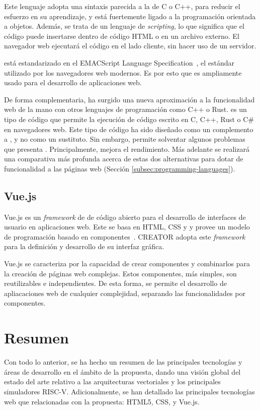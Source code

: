 Este lenguaje adopta una sintaxis parecida a la de C o C++, para reducir el esfuerzo en su aprendizaje, y está fuertemente ligado a la programación orientada a objetos. Además, se trata de un lenguaje de \textit{scripting}, lo que significa que el código puede insertarse dentro de código HTML o en un archivo externo. El navegador web ejecutará el código {\js} en el lado cliente, sin hacer uso de un servidor.

{\js} está estandarizado en el EMACScript Language Specification~\cite{EMACScript}, el estándar utilizado por los navegadores web modernos. Es por esto que {\js} es ampliamente usado para el desarrollo de aplicaciones web.

De forma complementaria, ha surgido una nueva aproximación a la funcionalidad web de la mano con otros lenguajes de programación como C++ o Rust. {\wa} es un tipo de código que permite la ejecución de código escrito en C, C++, Rust o C\# en navegadores web. Este tipo de código ha sido diseñado como un complemento a {\js}, y no como un sustituto. Sin embargo, permite solventar algunos problemas que presenta {\js}. Principalmente, mejora el rendimiento. Más adelante se realizará una comparativa más profunda acerca de estas dos alternativas para dotar de funcionalidad a las páginas web (Sección \ref{subsec:programming-languages}).

\subsection{Vue.js}
Vue.js es un \textit{framework} de {\js} de código abierto para el desarrollo de interfaces de usuario en aplicaciones web. Este se basa en HTML, CSS y {\js} y provee un modelo de programación basado en componentes~\cite{vuejs}. CREATOR adopta este \textit{framework} para la definición y desarrollo de su interfaz gráfica.

Vue.js se caracteriza por la capacidad de crear componentes y combinarlos para la creación de páginas web complejas. Estos componentes, más simples, son reutilizables e independientes. De esta forma, se permite el desarrollo de apliacaciones web de cualquier complejidad, separando las funcionalidades por componentes.

\section{Resumen}

Con todo lo anterior, se ha hecho un resumen de las principales tecnologías y áreas de desarrollo en el ámbito de la propuesta, dando una visión global del estado del arte relativo a las arquitecturas vectoriales y los principales simuladores RISC-V. Adicionalmente, se han detallado las principales tecnologías web que relacionadas con la propuesta: HTML5, CSS, {\js} y Vue.js\@.
